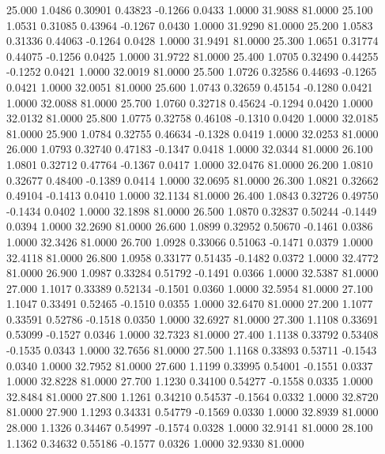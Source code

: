   25.000   1.0486   0.30901   0.43823  -0.1266   0.0433   1.0000  31.9088  81.0000
  25.100   1.0531   0.31085   0.43964  -0.1267   0.0430   1.0000  31.9290  81.0000
  25.200   1.0583   0.31336   0.44063  -0.1264   0.0428   1.0000  31.9491  81.0000
  25.300   1.0651   0.31774   0.44075  -0.1256   0.0425   1.0000  31.9722  81.0000
  25.400   1.0705   0.32490   0.44255  -0.1252   0.0421   1.0000  32.0019  81.0000
  25.500   1.0726   0.32586   0.44693  -0.1265   0.0421   1.0000  32.0051  81.0000
  25.600   1.0743   0.32659   0.45154  -0.1280   0.0421   1.0000  32.0088  81.0000
  25.700   1.0760   0.32718   0.45624  -0.1294   0.0420   1.0000  32.0132  81.0000
  25.800   1.0775   0.32758   0.46108  -0.1310   0.0420   1.0000  32.0185  81.0000
  25.900   1.0784   0.32755   0.46634  -0.1328   0.0419   1.0000  32.0253  81.0000
  26.000   1.0793   0.32740   0.47183  -0.1347   0.0418   1.0000  32.0344  81.0000
  26.100   1.0801   0.32712   0.47764  -0.1367   0.0417   1.0000  32.0476  81.0000
  26.200   1.0810   0.32677   0.48400  -0.1389   0.0414   1.0000  32.0695  81.0000
  26.300   1.0821   0.32662   0.49104  -0.1413   0.0410   1.0000  32.1134  81.0000
  26.400   1.0843   0.32726   0.49750  -0.1434   0.0402   1.0000  32.1898  81.0000
  26.500   1.0870   0.32837   0.50244  -0.1449   0.0394   1.0000  32.2690  81.0000
  26.600   1.0899   0.32952   0.50670  -0.1461   0.0386   1.0000  32.3426  81.0000
  26.700   1.0928   0.33066   0.51063  -0.1471   0.0379   1.0000  32.4118  81.0000
  26.800   1.0958   0.33177   0.51435  -0.1482   0.0372   1.0000  32.4772  81.0000
  26.900   1.0987   0.33284   0.51792  -0.1491   0.0366   1.0000  32.5387  81.0000
  27.000   1.1017   0.33389   0.52134  -0.1501   0.0360   1.0000  32.5954  81.0000
  27.100   1.1047   0.33491   0.52465  -0.1510   0.0355   1.0000  32.6470  81.0000
  27.200   1.1077   0.33591   0.52786  -0.1518   0.0350   1.0000  32.6927  81.0000
  27.300   1.1108   0.33691   0.53099  -0.1527   0.0346   1.0000  32.7323  81.0000
  27.400   1.1138   0.33792   0.53408  -0.1535   0.0343   1.0000  32.7656  81.0000
  27.500   1.1168   0.33893   0.53711  -0.1543   0.0340   1.0000  32.7952  81.0000
  27.600   1.1199   0.33995   0.54001  -0.1551   0.0337   1.0000  32.8228  81.0000
  27.700   1.1230   0.34100   0.54277  -0.1558   0.0335   1.0000  32.8484  81.0000
  27.800   1.1261   0.34210   0.54537  -0.1564   0.0332   1.0000  32.8720  81.0000
  27.900   1.1293   0.34331   0.54779  -0.1569   0.0330   1.0000  32.8939  81.0000
  28.000   1.1326   0.34467   0.54997  -0.1574   0.0328   1.0000  32.9141  81.0000
  28.100   1.1362   0.34632   0.55186  -0.1577   0.0326   1.0000  32.9330  81.0000
